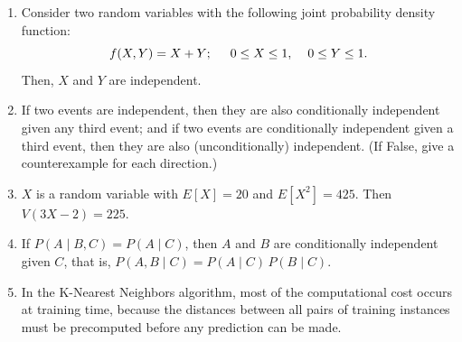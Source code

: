 \documentclass{article}
\begin{document}
\begin{enumerate}[1.]

\item Consider two random variables with the following joint probability density function:
\[f(X,Y) = X + Y; \hspace{0.5cm} 0\leq X \leq 1,\hspace{0.4cm}  0 \leq Y \leq 1. \]
Then, $X$ and $Y$ are independent.

\begin{tcolorbox}[breakable,enhanced,notitle,width=16.1cm,height=7cm]

\end{tcolorbox}

\item If two events are independent, then they are also conditionally independent given any third event; and if two events are conditionally independent given a third event, then they are also (unconditionally) independent. (If False, give a counterexample for each direction.)

\begin{tcolorbox}[breakable,enhanced,notitle,width=16.1cm,height=10cm]

\end{tcolorbox}

\item $X$ is a random variable with $E[X]=20$ and $E[X^2]=425$. Then $V(3X-2)=225$.

\begin{tcolorbox}[breakable,enhanced,notitle,width=16.1cm,height=6cm]

\end{tcolorbox}
\newpage

\item If $P(A \mid B, C) = P(A \mid C)$, then $A$ and $B$ are conditionally independent given $C$, that is, $P(A, B \mid C) = P(A \mid C)\,P(B \mid C)$.

\begin{tcolorbox}[breakable,enhanced,notitle,width=16.1cm,height=6cm]

\end{tcolorbox}

\item In the K-Nearest Neighbors algorithm, most of the computational cost occurs at training time, because the distances between all pairs of training instances must be precomputed before any prediction can be made.

\begin{tcolorbox}[breakable,enhanced,notitle,width=16.1cm,height=4cm]

\end{tcolorbox}

\end{enumerate}
\end{document}
